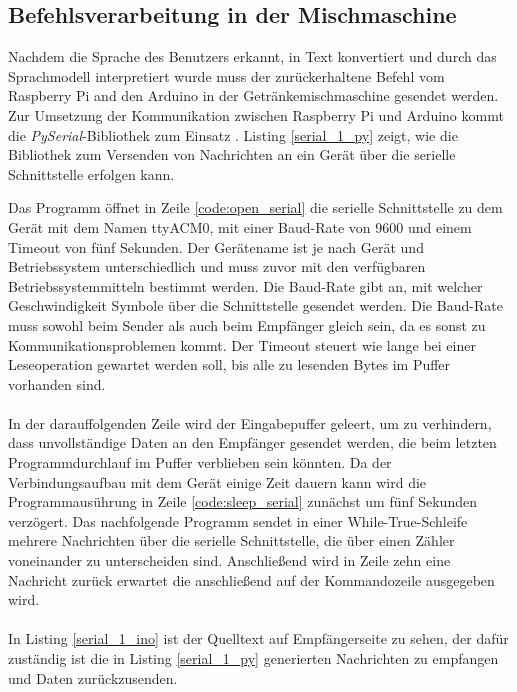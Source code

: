 \subsection{Befehlsverarbeitung in der Mischmaschine}\label{section:Befehlsverarbeitung}
Nachdem die Sprache des Benutzers erkannt, in Text konvertiert und durch das Sprachmodell interpretiert wurde muss der zurückerhaltene Befehl vom Raspberry Pi and den Arduino in der Getränkemischmaschine gesendet werden. Zur Umsetzung der Kommunikation zwischen Raspberry Pi und Arduino kommt die \textit{PySerial}-Bibliothek zum Einsatz \cite{pyserial}. Listing \ref{serial_1_py} zeigt, wie die Bibliothek zum Versenden von Nachrichten an ein Gerät über die serielle Schnittstelle erfolgen kann.

Das Programm öffnet in Zeile \ref{code:open_serial} die serielle Schnittstelle zu dem Gerät mit dem Namen \glqq{}ttyACM0\grqq{}, mit einer Baud-Rate von 9600 und einem Timeout von fünf Sekunden. Der Gerätename ist je nach Gerät und Betriebssystem unterschiedlich und muss zuvor mit den verfügbaren Betriebssystemmitteln bestimmt werden. Die Baud-Rate gibt an, mit welcher Geschwindigkeit Symbole über die Schnittstelle gesendet werden. Die Baud-Rate muss sowohl beim Sender als auch beim Empfänger gleich sein, da es sonst zu Kommunikationsproblemen kommt. Der Timeout steuert wie lange bei einer Leseoperation gewartet werden soll, bis alle zu lesenden Bytes im Puffer vorhanden sind.\\\\
In der darauffolgenden Zeile wird der Eingabepuffer geleert, um zu verhindern, dass unvollständige Daten an den Empfänger gesendet werden, die beim letzten Programmdurchlauf im Puffer verblieben sein könnten. Da der Verbindungsaufbau mit dem Gerät einige Zeit dauern kann wird die Programmausührung in Zeile \ref{code:sleep_serial} zunächst um fünf Sekunden verzögert. Das nachfolgende Programm sendet in einer While-True-Schleife mehrere Nachrichten über die serielle Schnittstelle, die über einen Zähler voneinander zu unterscheiden sind. Anschließend wird in Zeile zehn eine Nachricht zurück erwartet die anschließend auf der Kommandozeile ausgegeben wird.\\\\
In Listing \ref{serial_1_ino} ist der Quelltext auf Empfängerseite zu sehen, der dafür zuständig ist die in Listing \ref{serial_1_py} generierten Nachrichten zu empfangen und Daten zurückzusenden.

